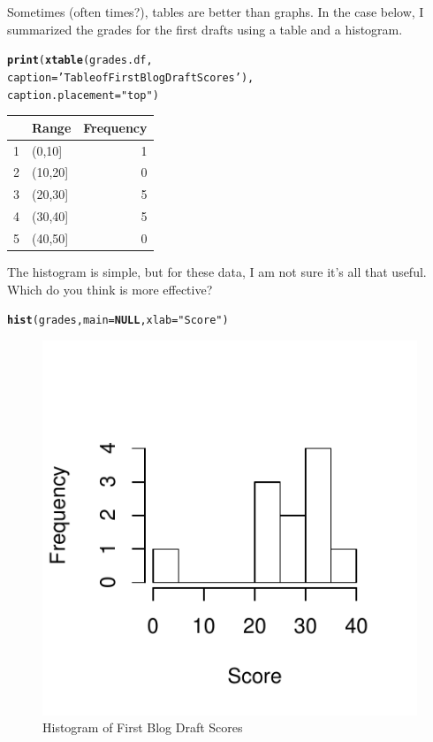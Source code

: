 \documentclass{article}\usepackage[]{graphicx}\usepackage[]{color}
\makeatletter
\def\maxwidth{ %
  \ifdim\Gin@nat@width>\linewidth
    \linewidth
  \else
    \Gin@nat@width
  \fi
}
\newcommand{\hlstr}[1]{\textcolor[rgb]{0.192,0.494,0.8}{#1}}%
\newcommand{\hlstd}[1]{\textcolor[rgb]{0.345,0.345,0.345}{#1}}%
\newcommand{\hlkwa}[1]{\textcolor[rgb]{0.161,0.373,0.58}{\textbf{#1}}}%
\newcommand{\hlkwc}[1]{\textcolor[rgb]{0.333,0.667,0.333}{#1}}%
\newcommand{\hlkwd}[1]{\textcolor[rgb]{0.737,0.353,0.396}{\textbf{#1}}}%
\newenvironment{kframe}{%
 \def\at@end@of@kframe{}%
 \ifinner\ifhmode%
  \def\at@end@of@kframe{\end{minipage}}%
  \begin{minipage}{\columnwidth}%
 \fi\fi%
 \def\FrameCommand##1{\hskip\@totalleftmargin \hskip-\fboxsep
 \colorbox{shadecolor}{##1}\hskip-\fboxsep
     \hskip-\linewidth \hskip-\@totalleftmargin \hskip\columnwidth}%
 \MakeFramed {\advance\hsize-\width
   \@totalleftmargin\z@ \linewidth\hsize
   \@setminipage}}%
 {\par\unskip\endMakeFramed%
 \at@end@of@kframe}
\newenvironment{knitrout}{}{} %
\makeatother
\begin{document}
Sometimes (often times?), tables are better than graphs. In the case below, I summarized the grades for the first drafts using a table and a histogram. 




\begin{kframe}
\begin{alltt}
\hlkwd{print}\hlstd{(}\hlkwd{xtable}\hlstd{(grades.df,}
      \hlkwc{caption}\hlstd{=}\hlstr{'Table of First Blog Draft Scores'}\hlstd{),}
      \hlkwc{caption.placement} \hlstd{=} \hlstr{"top"}\hlstd{)}
\end{alltt}
\end{kframe}%
% 
\begin{tabular}{rlr}
  \hline
 & Range & Frequency \\ 
  \hline
1 & (0,10] &   1 \\ 
  2 & (10,20] &   0 \\ 
  3 & (20,30] &   5 \\ 
  4 & (30,40] &   5 \\ 
  5 & (40,50] &   0 \\ 
   \hline
\end{tabular}


The histogram is simple, but for these data, I am not sure it's all that useful. Which do you think is more effective?

\bigskip
\begin{knitrout}
\color{fgcolor}\begin{kframe}
\begin{alltt}
\hlkwd{hist}\hlstd{(grades,} \hlkwc{main}\hlstd{=}\hlkwa{NULL}\hlstd{,} \hlkwc{xlab}\hlstd{=}\hlstr{"Score"}\hlstd{)}
\end{alltt}
\end{kframe}\begin{figure}
\includegraphics[width=\maxwidth]{figure/unnamed-chunk-13-1} \caption[Histogram of First Blog Draft Scores]{Histogram of First Blog Draft Scores}\label{fig:unnamed-chunk-13}
\end{figure}


\end{knitrout}
\end{document}
